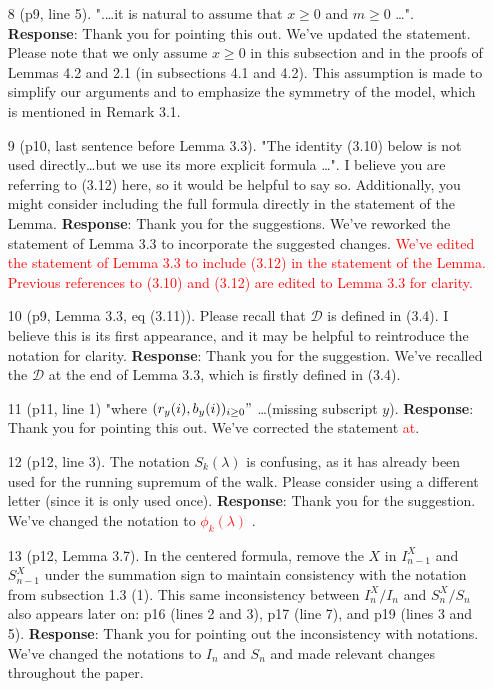 \documentclass[11pt,a4paper]{article}
\numberwithin{equation}{section}
\def\TBF#1{\textcolor{red}{#1}} %
\def\TBC#1{\textcolor{red}{#1}} %
\begin{document}
\begin{itemize}
		
		
		\item[8] (p9, line 5). ".\dots it is natural to assume that $x \geq 0$ and $m \geq 0$ \dots".
		\subitem \textbf{Response}:  Thank you for pointing this out.  We've updated the statement. Please note that we only assume $x\geq 0$ in this subsection and in the proofs of Lemmas 4.2 and 2.1 (in subsections 4.1 and 4.2). This assumption is made to simplify our arguments and to emphasize the symmetry of the model, which is mentioned in Remark 3.1.
		
		\item [9] (p10, last sentence before Lemma 3.3). "The identity (3.10) below is not used directly\dots but we use its more explicit formula \dots ". I believe you are referring to (3.12) here, so it would be helpful to say so. Additionally, you might consider including the full formula directly in the statement of the Lemma.
		\subitem \textbf{Response}: Thank you for the suggestions. We've reworked the statement of Lemma 3.3 to incorporate the suggested changes.
		\TBF{We've edited the statement of Lemma 3.3 to include (3.12) in the statement of the Lemma. Previous references to (3.10) and (3.12) are edited to Lemma 3.3 for clarity.}
		
		\item [10] (p9, Lemma 3.3, eq (3.11)). Please recall that $\mathcal{D}$ is defined in (3.4). I believe this is its first appearance, and it may be helpful to reintroduce the notation for clarity.
		\subitem \textbf{Response}:  Thank you for the suggestion. We've recalled the $\mathcal{D}$ at the end of Lemma 3.3, which is firstly defined in (3.4).
		
		
		
		\item [11] (p11, line 1) "where $(r_y(i),b_y(i))_{i\geq 0}"$ \dots (missing subscript $y$).
		\subitem \textbf{Response}:  Thank you for pointing this out.  We've corrected the statement \TBF{at}.
		
		
		\item[12] (p12, line 3). The notation $S_k(\lambda)$ is confusing, as it has already been used for the running supremum of the walk. Please consider using a different letter (since it is only used once).
		\subitem \textbf{Response}:  Thank you for the suggestion.  We've changed the notation to \TBC{${\phi}_k(\lambda) $} .
		
		
		\item[13] (p12, Lemma 3.7). In the centered formula, remove the $X$ in $I^X_{n-1}$
		and $S^X_{n-1}$ under the summation sign to maintain consistency with the notation from subsection 1.3 (1). This same inconsistency between $I^X_n /I_n$ and $S^X_n/S_n$ also appears later on: p16 (lines 2 and 3), p17 (line 7), and p19 (lines 3 and 5).
		\subitem \textbf{Response}:  Thank you for pointing out the inconsistency with notations.  We've changed the notations to $I_n$ and $S_n$ and made relevant changes throughout the paper.
		

\end{itemize}
\end{document}
